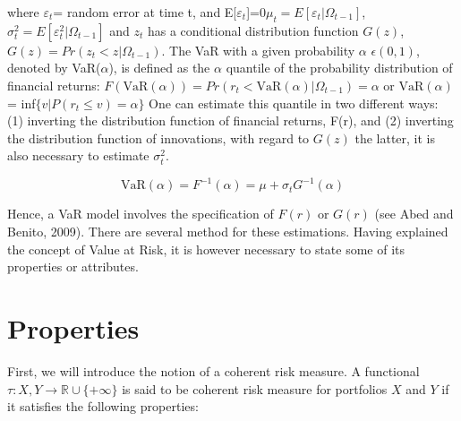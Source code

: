 \documentclass[a4paper,11pt,oneside]{book}
\begin{document}
where $\varepsilon_t$= random error at time t, and E[$\varepsilon_t$]=0\newline $\mu_t= E[\varepsilon_t|\Omega_{t-1}]$, $\sigma^2_t = E[\varepsilon^2_t|\Omega_{t-1}]$ and $z_t$ has a conditional distribution function $G(z)$, $G(z) = Pr(z_t < z|\Omega_{t-1})$. The VaR with a given probability $\alpha$ $\epsilon(0,1)$, denoted by VaR($\alpha$), is defined as the $\alpha$ quantile of the probability distribution of financial returns:\newline
$F(\text{VaR}(\alpha))=Pr(r_t < \text{VaR}(\alpha)|\Omega_{t-1})=\alpha$ or $\text{VaR}(\alpha)$ = inf$\{v|P(r_t \leq v)= \alpha\}$
\newline\newline
One can estimate this quantile in two different ways: (1) inverting the distribution function of financial returns, F(r), and (2)
inverting the distribution function of innovations, with regard to
$G(z)$ the latter, it is also necessary to estimate $\sigma^2_t$. 

\begin{equation}
\text{VaR} (\alpha) = F^{-1}(\alpha) = \mu + \sigma_tG^{-1}(\alpha)
\label{2}
\end{equation}

Hence, a VaR model involves the specification of $F(r)$ or $G(r)$ (see Abed and Benito, 2009). There are several method for these estimations. Having explained the concept of Value at Risk, it is however necessary to state some of its properties or attributes.



\section{Properties}

First, we will introduce the notion of a coherent risk measure. A functional $\tau: X,Y \rightarrow \mathbb{R} \cup \{+\infty\}$ is said to be coherent risk measure for portfolios $X$ and $Y$ if it satisfies the following properties:
\newline
\end{document}

